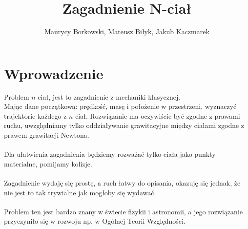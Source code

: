 \documentclass{article}
\title{Zagadnienie N-ciał}
\date{}
\author{Maurycy Borkowski, Mateusz Biłyk, Jakub Kaczmarek}
\begin{document}
\maketitle
\clearpage
\tableofcontents
\clearpage
\section{Wprowadzenie}
Problem $n$ ciał, jest to zagadnienie z mechaniki klasycznej.\\Mając dane początkową: prędkość, masę i położenie w przestrzeni, wyznaczyć trajektorie każdego z $n$ ciał. Rozwiązanie ma oczywiście być zgodne z prawami ruchu, uwzględniamy tylko oddziaływanie grawitacyjne między ciałami zgodne z prawem grawitacji Newtona.\\\\
Dla ułatwienia zagadnienia będziemy rozważać tylko ciała jako punkty materialne, pomijamy kolizje. \\\\
Zagadnienie wydaję się prostę, a ruch łatwy do opisania, okazuję się jednak, że nie jest to tak trywialne jak mogłoby się wydawać.\\\\
Problem ten jest bardzo znany w świecie fizykii i astronomii, a jego rozwiązanie przyczyniło się w rozwoju np. w Ogólnej Teorii Względności.
\clearpage
\end{document}
